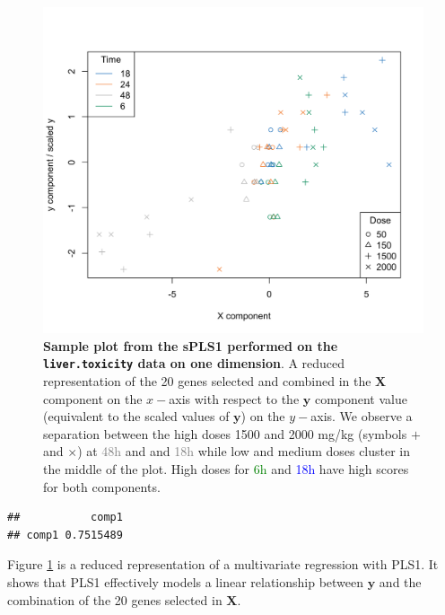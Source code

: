\documentclass[]{book}
\newenvironment{Shaded}{\begin{snugshade}}{\end{snugshade}}
\newcommand{\KeywordTok}[1]{\textcolor[rgb]{0.13,0.29,0.53}{\textbf{#1}}}
\newcommand{\OperatorTok}[1]{\textcolor[rgb]{0.81,0.36,0.00}{\textbf{#1}}}
\newcommand{\NormalTok}[1]{#1}
\begin{document}
\begin{figure}

{\centering \includegraphics[width=0.5\linewidth]{Figures/PLS/spls1-comp1-1} 

}

\caption{\textbf{Sample plot from the sPLS1 performed on the
\texttt{liver.toxicity} data on one dimension}. A reduced representation
of the 20 genes selected and combined in the \(\boldsymbol X\) component
on the \(x-\)axis with respect to the \(\boldsymbol y\) component value
(equivalent to the scaled values of \(\boldsymbol y\)) on the
\(y-\)axis. We observe a separation between the high doses 1500 and 2000
mg/kg (symbols \(+\) and \(\times\)) at \textcolor{grey}{48h} and and
\textcolor{grey}{18h} while low and medium doses cluster in the middle
of the plot. High doses for \textcolor{green}{6h} and
\textcolor{blue}{18h} have high scores for both components.}\label{fig:spls1-comp1}
\end{figure}

\begin{Shaded}
\end{Shaded}

\begin{verbatim}
##           comp1
## comp1 0.7515489
\end{verbatim}












Figure \ref{fig:spls1-comp1} is a reduced representation of a
multivariate regression with PLS1. It shows that PLS1 effectively models
a linear relationship between \(\boldsymbol y\) and the combination of
the 20 genes selected in \(\boldsymbol X\).
\end{document}

